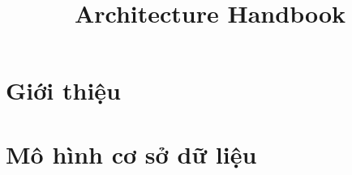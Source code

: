 \documentclass[12pt, a4paper]{article}
\title{Architecture Handbook}
\begin{document}

\clearpage


\clearpage

\tableofcontents
\clearpage

%	




% 
\section{Giới thiệu}


\section{Mô hình cơ sở dữ liệu}



\end{document}
